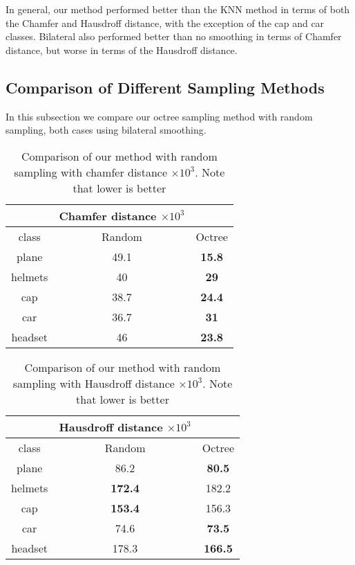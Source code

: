 In general, our method performed better than the KNN method in terms of both the Chamfer and Hausdroff distance, with the exception of the cap and car classes. 
Bilateral also performed better than no smoothing in terms of Chamfer distance, but worse in terms of the Hausdroff distance.

\subsection{Comparison of Different Sampling Methods}

In this subsection we compare our octree sampling method with random sampling, both cases using bilateral smoothing.

\begin{table}[H]
\centering
\begin{tabular}{ccc}
	& Chamfer distance $\times 10^3$ &\\
	\hline
	class & Random & Octree \\
	\hline
	plane & {49.1} & \textbf{15.8} \\ 
	helmets & {40} & \textbf{29} \\
	cap & {38.7} & \textbf{24.4} \\  
	car & {36.7} & \textbf{31} \\  
	headset & {46} & \textbf{23.8}  \\
\end{tabular}
\caption{Comparison of our method with random sampling with chamfer distance $\times 10^3$. Note that lower is better}
\end{table}

\begin{table}[H]
\centering
\begin{tabular}{ccc}
	& Hausdroff distance $\times 10^3$ &\\
	\hline
	class & Random & Octree \\
	\hline
	plane & 86.2 & \textbf{80.5} \\
	helmets & \textbf{172.4} &  {182.2}\\
cap & \textbf{153.4} & {156.3} \\
car & {74.6} & \textbf{73.5} \\
headset & 178.3 & \textbf{166.5} \\
\end{tabular}
\caption{Comparison of our method with random sampling with Hausdroff distance $\times 10^3$. Note that lower is better}
\end{table}

